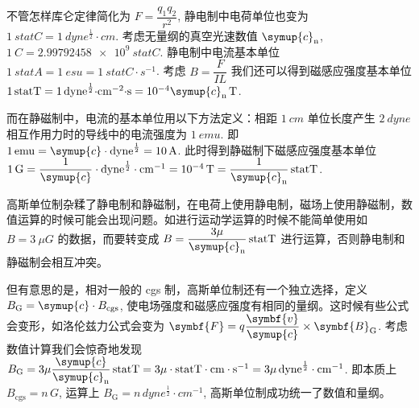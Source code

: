 \documentclass[../天体物理基础.tex]{subfiles}
\begin{document}
不管怎样库仑定律简化为 $F=\dfrac{q_{1}q_{2}}{r^{2}}$, 静电制中电荷单位也变为 $\qty{1}{statC}=\qty{1}{dyne^{\frac{1}{2}}\cdot cm}$. 考虑无量纲的真空光速数值 $\symup{c}_{\mathrm{n}}$, $\qty{1}{C}=\qty{2.99792458e9}{statC}$. 静电制中电流基本单位 $\qty{1}{statA}=\qty{1}{esu}=\qty{1}{statC\cdot{}s^{-1}}$. 考虑 $B=\dfrac{F}{IL}$ 我们还可以得到磁感应强度基本单位 $\qty{1}{statT}=\qty{1}{dyne^{\frac{1}{2}}\cdot cm^{-2}\cdot s}=10^{-4}\symup{c}_{\mathrm{n}}\,\unit{T}$.

而在静磁制中，电流的基本单位用以下方法定义：相距 $\qty{1}{cm}$ 单位长度产生 $\qty{2}{dyne}$ 相互作用力时的导线中的电流强度为 $\qty{1}{emu}$. 即 $\qty{1}{emu}=\symup{c}\cdot\unit{dyne^{\frac{1}{2}}}=\qty{10}{A}$. 此时得到静磁制下磁感应强度基本单位 $\qty{1}{G}=\dfrac{1}{\symup{c}}\cdot\unit{dyne}^{\frac{1}{2}}\cdot\unit{cm}^{-1}=\qty{e-4}{T}=\dfrac{1}{\symup{c}_{\mathrm{n}}}\,\unit{statT}$.

高斯单位制杂糅了静电制和静磁制，在电荷上使用静电制，磁场上使用静磁制，数值运算的时候可能会出现问题。如进行运动学运算的时候不能简单使用如 $B=\qty{3}{\mu G}$ 的数据，而要转变成 $B=\dfrac{3\mu}{\symup{c}_{\mathrm{n}}}\,\unit{statT}$ 进行运算，否则静电制和静磁制会相互冲突。

但有意思的是，相对一般的 cgs 制，高斯单位制还有一个独立选择，定义 $B_{\mathrm{G}}=\symup{c}\cdot B_{\mathrm{cgs}}$, 使电场强度和磁感应强度有相同的量纲。这时候有些公式会变形，如洛伦兹力公式会变为 $\symbf{F}=q\dfrac{\symbf{v}}{\symup{c}}\times\symbf{B}_{\mathrm{G}}$. 考虑数值计算我们会惊奇地发现 $B_{\mathrm{G}}=3\mu\dfrac{\symup{c}}{\symup{c}_{\mathrm{n}}}\,\unit{statT}=3\mu\cdot\unit{statT}\cdot\unit{cm\cdot{}s^{-1}}=3\mu\,\unit{dyne^{\frac{1}{2}}}\cdot\unit{cm}^{-1}$. 即本质上 $B_{\mathrm{cgs}}=n\,\unit{G}$, 运算上 $B_{\mathrm{G}}=n\,\unit{dyne^{\frac{1}{2}}\cdot cm^{-1}}$, 高斯单位制成功统一了数值和量纲。
\end{document}

